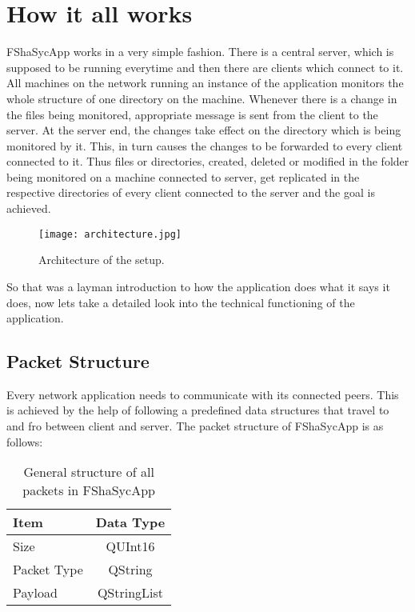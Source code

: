 
\section{How it all works}
\label{sec:working}
FShaSycApp works in a very simple fashion. There is a central server, which is supposed to be running everytime and then there are clients which connect to it. All machines on the network running an instance of the application monitors the whole structure of one directory on the machine. Whenever there is a change in the files being monitored, appropriate message is sent from the client to the server. At the server end, the changes take effect on the directory which is being monitored by it. This, in turn causes the changes to be forwarded to every client connected to it. Thus files or directories, created, deleted or modified in the folder being monitored on a machine connected to server, get replicated in the respective directories of every client connected to the server and the goal is achieved.
\begin{figure}[h!]
  \centering
    \texttt{[image: architecture.jpg]}
    \caption{Architecture of the setup.}
\end{figure}

So that was a layman introduction to how the application does what it says it does, now lets take a detailed look into the technical functioning of the application.
\subsection{Packet Structure} \label{subsec:packetStructure}
Every network application needs to communicate with its connected peers. This is achieved by the help of following a predefined data structures that travel to and fro between client and server. The packet structure of FShaSycApp is as follows:

\begin{table} [h]
  \begin{center}
    \begin{tabular} {|| l | c ||}
      \hline
      \textbf{Item} & \textbf{Data Type} \\
      \hline
      \hline
      Size & QUInt16 \\ 
      \hline
      Packet Type & QString\\
      \hline
      Payload & QStringList\\
      \hline 
      
    \end{tabular}
    \caption{General structure of all packets in FShaSycApp}
    \label{tab:packetStructure}
  \end{center}
\end{table}

